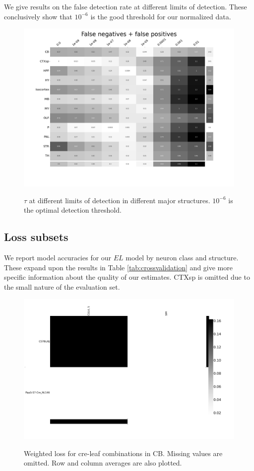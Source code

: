 We give results on the false detection rate at different limits of detection.
These conclusively show that $10^{-6}$ is the good threshold for our normalized data.
\begin{figure}[H]
    \centering
    \includegraphics[width = 7in]{figs/Threshold.png}
    \label{fig:threshold}
    \caption{$\tau$ at different limits of detection in different major structures.  $10^{-6}$ is the optimal detection threshold.}
\end{figure}

\newpage

\subsection{Loss subsets}
\label{supp_sec:loss_subsets}

We report model accuracies for our $EL$ model by neuron class and structure.
These expand upon the results in Table \ref{tab:crossvalidation} and give more specific information about the quality of our estimates.   CTXsp is omitted due to the small nature of the evaluation set.

\begin{figure}[H]
    \centering
    \includegraphics[width = 7in]{figs/lossdetails_512.png} 
    \label{fig:distances}
    \caption{Weighted loss for cre-leaf combinations in CB.  Missing values are omitted.   Row and column averages are also plotted.}
\end{figure}

